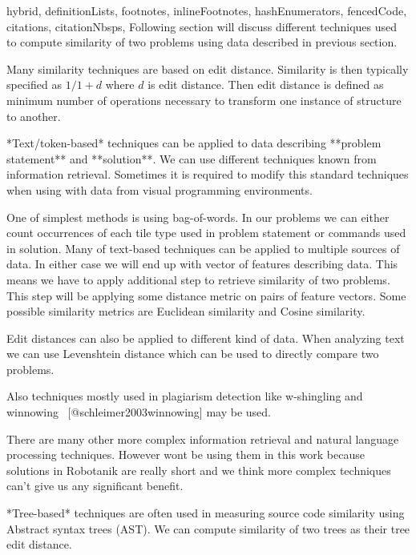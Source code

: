 \documentclass[
  digital, %
  table,   %
  lof,     %
  lot,     %
]{fithesis3}
\begin{document}
\begin{markdown*}{%
  hybrid,
  definitionLists,
  footnotes,
  inlineFootnotes,
  hashEnumerators,
  fencedCode,
  citations,
  citationNbsps,
}
Following section will discuss different techniques used to compute similarity of two problems using data described in previous section.

Many similarity techniques are based on edit distance. Similarity is then typically specified as $1/{1+d}$ where $d$ is edit distance. Then edit distance is defined as minimum number of operations necessary to transform one instance of structure to another.

*Text/token-based* techniques can be applied to data describing **problem statement** and **solution**. We can use different techniques known from information retrieval. Sometimes it is required to modify this standard techniques when using with data from visual programming environments.

One of simplest methods is using bag-of-words. In our problems we can either count occurrences of each tile type used in problem statement or commands used in solution. Many of text-based techniques can be applied to multiple sources of data. In either case we will end up with vector of features describing data. This means we have to apply additional step to retrieve similarity of two problems. This step will be applying some distance metric on pairs of feature vectors. Some possible similarity metrics are Euclidean similarity and Cosine similarity.

Edit distances can also be applied to different kind of data. When analyzing text we can use Levenshtein distance which can be used to directly compare two problems.

Also techniques mostly used in plagiarism detection like w-shingling and winnowing ~[@schleimer2003winnowing] may be used.

There are many other more complex information retrieval and natural language processing techniques. However wont be using them in this work because solutions in Robotanik are really short and we think more complex techniques can't give us any significant benefit.



*Tree-based* techniques are often used in measuring source code similarity using Abstract syntax trees (AST). We can compute similarity of two trees as their tree edit distance.


\end{markdown*}
\end{document}

